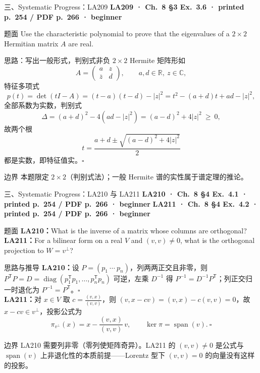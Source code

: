 \documentclass[aspectratio=169,10pt,fontset=none]{ctexbeamer}
\newcommand{\ex}[1]{\textcolor{accent}{\footnotesize\bfseries #1}}
\begin{document}
\begin{frame}[t]{三、Systematic Progress：LA209}
  \leavevmode\ex{LA209 · Ch.~8 §3 Ex.~3.6 · printed p.~254 / PDF p.~266 · beginner}
  \begin{block}{\footnotesize 题面}
    \scriptsize Use the characteristic polynomial to prove that the eigenvalues of a $2\times2$ Hermitian matrix $A$ are real.
  \end{block}
  \begin{exampleblock}{\footnotesize 思路：写出一般形式，判别式非负}
    \scriptsize
    $2\times2$ Hermite 矩阵形如
    $$A=\begin{pmatrix}a&z\\\overline z&d\end{pmatrix},\qquad a,d\in\mathbb R,\ z\in\mathbb C,$$
    特征多项式
    $$p(t)=\det(tI-A)=(t-a)(t-d)-|z|^2=t^2-(a+d)t+ad-|z|^2,$$
    全部系数为实数，判别式
    $$\Delta=(a+d)^2-4(ad-|z|^2)=(a-d)^2+4|z|^2\ \ge\ 0,$$
    故两个根
    $$t=\frac{a+d\pm\sqrt{(a-d)^2+4|z|^2}}2$$
    都是实数，即特征值实。$\square$
  \end{exampleblock}
  \begin{block}{\footnotesize 边界}
    \scriptsize 本题限定 $2\times2$（判别式法）；一般 Hermite 谱的实性属于谱定理的推论。
  \end{block}
\end{frame}

\begin{frame}[t]{三、Systematic Progress：LA210 与 LA211}
  \leavevmode\ex{LA210 · Ch.~8 §4 Ex.~4.1 · printed p.~254 / PDF p.~266 · beginner}\quad
  \ex{LA211 · Ch.~8 §4 Ex.~4.2 · printed p.~254 / PDF p.~266 · beginner}
  \begin{block}{\footnotesize 题面}
    \scriptsize \textbf{LA210：}What is the inverse of a matrix whose columns are orthogonal?\\
    \textbf{LA211：}For a bilinear form on a real $V$ and $(v,v)\ne0$, what is the orthogonal projection to $W=v^\perp$?
  \end{block}
  \begin{exampleblock}{\footnotesize 思路与推导}
    \scriptsize
    \textbf{LA210：}设 $P=(p_1\ \cdots\ p_n)$，列两两正交且非零，则 $P^{\mathsf T}P=D=\operatorname{diag}(p_1^{\mathsf T}p_1,\ldots,p_n^{\mathsf T}p_n)$ 可逆，左乘 $D^{-1}$ 得 $\boxed{P^{-1}=D^{-1}P^{\mathsf T}}$；列正交归一时退化为 $P^{-1}=P^{\mathsf T}$。$\square$\\[3pt]
    \textbf{LA211：}对 $x\in V$ 取 $c=\frac{(v,x)}{(v,v)}$，则 $(v,x-cv)=(v,x)-c(v,v)=0$，故 $x-cv\in v^\perp$，投影公式为
    $$\boxed{\pi_{v^\perp}(x)=x-\frac{(v,x)}{(v,v)}\,v},\qquad \ker\pi=\operatorname{span}(v).\ \square$$
  \end{exampleblock}
  \begin{block}{\footnotesize 边界}
    \scriptsize LA210 需要列非零（零列使矩阵奇异）。LA211 的 $(v,v)\ne0$ 是公式与 $\operatorname{span}(v)$ 上非退化性的本质前提——Lorentz 型下 $(v,v)=0$ 的向量没有这样的投影。
  \end{block}
\end{frame}
\end{document}
